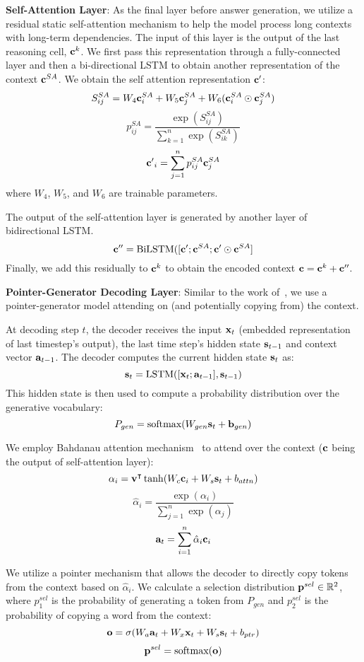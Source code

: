 \documentclass[11pt,a4paper]{article}
\newcommand{\R}{\mathbb{R}}
\newcommand{\softmax}{\text{softmax}}
\newcommand{\decCell}{\text{LSTM}}
\newcommand\bvect[1]{{\bf #1}}
\begin{document}
\noindent\textbf{Self-Attention Layer}:
As the final layer before answer generation, we utilize a residual static self-attention mechanism \cite{clark2017simple} to help the model process long contexts with long-term dependencies.
The input of this layer is the output of the last reasoning cell, $\bvect{c}^k$. We first pass this representation through a fully-connected layer and then a bi-directional LSTM to obtain another representation of the context $\bvect{c}^{SA}$.
We obtain the self attention representation $\bvect{c'}$:
\[S_{ij}^{SA} = W_4 \bvect{c}^{SA}_i + W_5 \bvect{c}^{SA}_j + W_6 (\bvect{c}^{SA}_i \odot \bvect{c}^{SA}_j)\]
\[p_{ij}^{SA} = \frac{\exp(S_{ij}^{SA})}{\sum_{k=1}^n \exp(S_{ik}^{SA})}\]
\[\bvect{c'}_i = \sum_{j=1}^n p_{ij}^{SA} \bvect{c}^{SA}_j\]
where $W_4$, $W_5$, and $W_6$ are trainable parameters. 

The output of the self-attention layer is generated by another layer of bidirectional LSTM. 
\[\bvect{c''} = \text{BiLSTM}([\bvect{c'} ; \bvect{c}^{SA} ; \bvect{c'} \odot \bvect{c}^{SA}]\]
Finally, we add this residually to $\bvect{c}^k$ to obtain the encoded context $\bvect{c} = \bvect{c}^k + \bvect{c''}$.

\noindent\textbf{Pointer-Generator Decoding Layer}: 
Similar to the work of~, we use a pointer-generator model attending on (and potentially copying from) the context.

At decoding step $t$, 
the decoder receives the input $\bvect{x}_t$ (embedded representation of last timestep's output), the last time step's hidden state $\bvect{s}_{t-1}$ and context vector $\bvect{a}_{t-1}$.
The decoder computes the current hidden state $\bvect{s}_t$ as:
\[\bvect{s}_t = \decCell([\bvect{x}_t; \bvect{a}_{t-1}], \bvect{s}_{t-1})\]
This hidden state is then used to compute a probability distribution over the generative vocabulary:
\[P_{gen} = \softmax(W_{gen} \bvect{s}_t + \bvect{b}_{gen})\]

We employ Bahdanau attention mechanism~\cite{bahdanau2014neural} to attend over the context ($\bvect{c}$ being the output of self-attention layer):
\[\alpha_i = \bvect{v}^\intercal \tanh(W_c \bvect{c}_i + W_s \bvect{s}_t + b_{attn})\]
\[\hat \alpha_i = \frac{\exp(\alpha_i)}{\sum_{j=1}^n \exp(\alpha_j)}\]
\[\bvect{a}_t = \sum_{i=1}^n \hat \alpha_i \bvect{c}_i\]

We utilize a pointer mechanism that allows the decoder to directly copy tokens from the context based on $\hat \alpha_i$.
We calculate a selection distribution $\bvect{p}^{sel} \in \R^2$, where $p^{sel}_1$ is the probability of generating a token from $P_{gen}$ and $p^{sel}_2$ is the probability of copying a word from the context:
\[\bvect{o} = \sigma(W_a \bvect{a}_t + W_x \bvect{x}_t + W_s \bvect{s}_t + b_{ptr})\]
\[\bvect{p}^{sel} = \softmax(\bvect{o})\]
\end{document}
